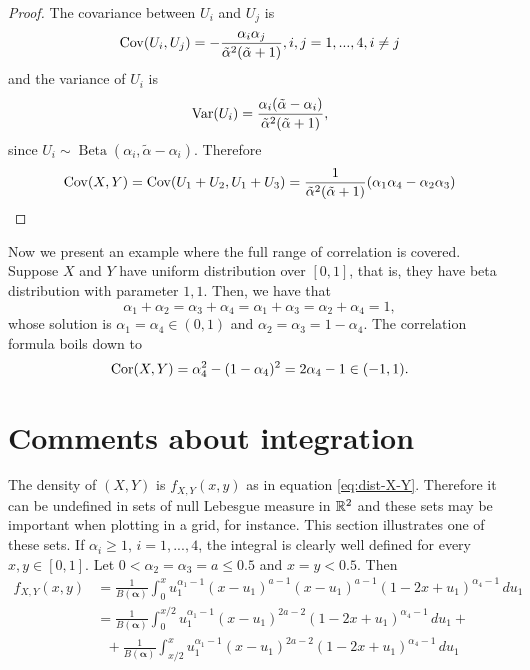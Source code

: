 \begin{proof}

  The covariance between $U_i$ and $U_j$ is \cite[p. 11]{lin2016dirichlet} 
\begin{equation}
  \operatorname{Cov}(U_i, U_j) = - \frac{\alpha_i\alpha_j}{\tilde{\alpha}^2(\tilde{\alpha}+1)}, i,j = 1,...,4, i \neq j
\end{equation} 
and the variance of $U_i$ is 
\begin{equation}
  \operatorname{Var}(U_i) = \frac{\alpha_i(\tilde{\alpha}-\alpha_i)}{\tilde{\alpha}^2(\tilde{\alpha}+1)},
\end{equation}
since $U_i \sim \operatorname{Beta}(\alpha_i, \tilde{\alpha} -\alpha_i)$.
Therefore 
\begin{equation}
  \operatorname{Cov}(X,Y) = \operatorname{Cov}(U_1+U_2, U_1+U_3) = \frac{1}{\tilde{\alpha}^2(\tilde{\alpha}+1)}(\alpha_1\alpha_4 - \alpha_2\alpha_3)
\end{equation}
  
\end{proof}

Now we present an example where the full range of correlation is covered.
Suppose $X$ and $Y$ have uniform distribution over $[0,1]$, that is, they have
beta distribution with parameter $1,1$. Then, we have that 
$$\alpha_1 +
\alpha_2 = \alpha_3 + \alpha_4 = \alpha_1 + \alpha_3 = \alpha_2 + \alpha_4 = 1,$$
whose solution is $\alpha_1 = \alpha_4 \in (0,1)$ and $\alpha_2 = \alpha_3 = 1
- \alpha_4$. The correlation formula boils down to 
$$\operatorname{Cor}(X,Y) = \alpha_4^2 - (1 - \alpha_4)^2 = 2\alpha_4 - 1 \in (-1,1).$$

\section{Comments about integration}

The density of $(X,Y)$ is $f_{X,Y}(x,y)$ as in equation \eqref{eq:dist-X-Y}. Therefore it can be undefined in sets of null Lebesgue measure in $\mathbb{R}^2$ and these sets may be important when plotting in a grid, for instance. This section illustrates one of these sets. If $\alpha_i \ge 1,
\, i = 1,...,4$, the integral is clearly well defined for every $x,y \in [0,1]$. Let $0 < \alpha_2 = \alpha_3 = a \le 0.5$ and $x = y < 0.5$. Then
\begin{equation*}
  \begin{split}
    f_{X,Y}(x,y) &= \frac{1}{B(\boldsymbol{\alpha})}\int_{0}^x u_1^{\alpha_1-1}(x-u_1)^{a-1}(x-u_1)^{a-1}(1-2x+u_1)^{\alpha_4-1} \, du_1 \\
    &= \frac{1}{B(\boldsymbol{\alpha})}\int_{0}^{x/2} u_1^{\alpha_1-1}(x-u_1)^{2a-2}(1-2x+u_1)^{\alpha_4-1} \, du_1 + \\
    &~~~+ \frac{1}{B(\boldsymbol{\alpha})}\int_{x/2}^x u_1^{\alpha_1-1}(x-u_1)^{2a-2}(1-2x+u_1)^{\alpha_4-1} \, du_1
  \end{split}
\end{equation*}

